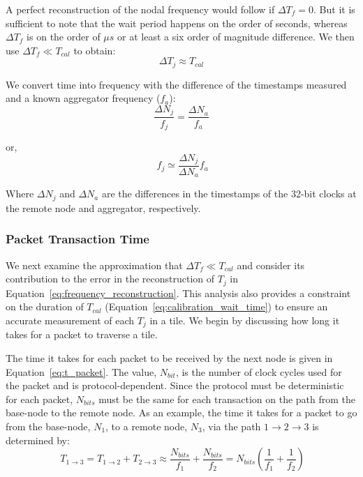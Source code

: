 A perfect reconstruction of the nodal frequency would follow if $\Delta T_{f} = 0$.
But it is sufficient to note that the wait period happens on the order of seconds, whereas $\Delta T_{f}$ is on the order of $\mu s$ or at least a six order of magnitude difference.
We then use $\Delta T_{f} \ll T_{cal}$ to obtain:
\begin{equation}
  \Delta T_{j} \approx T_{cal}
\end{equation}

We convert time into frequency with the difference of the timestamps measured and a known aggregator frequency ($f_{a}$):
\begin{equation}
   \frac{\Delta N_{j}}{f_{j}} = \frac{\Delta N_{a}}{f_{a}}
\end{equation}

or,
\begin{equation}~\label{eq:frequency_reconstruction}
   \boxed{f_{j} \simeq \frac{\Delta N_{j}}{\Delta N_{a}}f_{a}}
\end{equation}

Where $\Delta N_{j}$ and $\Delta N_{a}$ are the differences in the timestamps of the 32-bit clocks at the remote node and aggregator, respectively.


\subsubsection{Packet Transaction Time}

We next examine the approximation that $\Delta T_{f} \ll T_{cal}$ and consider its contribution to the error in the reconstruction of $T_{j}$ in Equation~\ref{eq:frequency_reconstruction}.
This analysis also provides a constraint on the duration of $T_{cal}$ (Equation~\ref{eq:calibration_wait_time}) to ensure an accurate measurement of each $T_{j}$ in a tile.
We begin by discussing how long it takes for a packet to traverse a tile.

The time it takes for each packet to be received by the next node is given in Equation~\ref{eq:t_packet}.
The value, $N_{bit}$, is the number of clock cycles used for the packet and is protocol-dependent.
Since the protocol must be deterministic for each packet, $N_{bits}$ must be the same for each transaction on the path from the base-node to the remote node.
As an example, the time it takes for a packet to go from the base-node, $N_{1}$, to a remote node, $N_{3}$, via the path $1\rightarrow 2 \rightarrow 3$ is determined by:
\begin{equation}~\label{eq:t_packetTransfer}
  T_{1\rightarrow 3} = T_{1\rightarrow 2} + T_{2\rightarrow 3} \approx \frac{N_{bits}}{f_{1}} + \frac{N_{bits}}{f_{2}} = N_{bits}(\frac{1}{f_{1}} + \frac{1}{f_{2}})
\end{equation}

